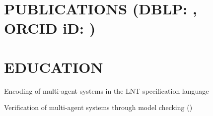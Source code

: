 \documentclass[a4paper]{deedy-resume-openfont}
\begin{document}
\hfill
\begin{minipage}[t]{0.67\textwidth} 

\section[Publications]{PUBLICATIONS \small{(DBLP: \href{https://dblp.org/pid/215/9758}{}, ORCID iD: \href{https://orcid.org/0000-0003-1922-3151}{})}}
\vspace{\topsep} %

\nocite{*}



\sectionsep


\section{EDUCATION}

\begin{tightemize}
    \item Encoding of multi-agent systems in the LNT specification language
    \item Verification of multi-agent systems through model checking (\href{https://cadp.inria.fr/}{})
\end{tightemize}
\sectionsep


\end{minipage}
\end{document}
